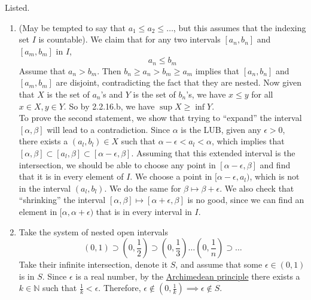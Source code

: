   \begin{solution}
    Listed. 
    \begin{enumerate}
      \item (May be tempted to say that $a_1 \leq a_2 \leq \ldots$, but this assumes that the indexing set $I$ is countable). We claim that for any two intervals $[a_n, b_n]$ and $[a_m, b_m]$ in $I$, 
      \begin{equation}
        a_n \leq b_m
      \end{equation}
      Assume that $a_n > b_m$. Then $b_n \geq a_n > b_m \geq a_m$ implies that $[a_n, b_n]$ and $[a_m, b_m]$ are disjoint, contradicting the fact that they are nested. Now given that $X$ is the set of $a_n$'s and $Y$ is the set of $b_n$'s, we have $x \leq y$ for all $x \in X, y \in Y$. So by 2.2.16.b, we have $\sup{X} \geq \inf{Y}$. 
      \\
      To prove the second statement, we show that trying to ``expand'' the interval $[\alpha, \beta]$ will lead to a contradiction. Since $\alpha$ is the LUB, given any $\epsilon > 0$, there exists a $(a_l, b_l) \in X$ such that $\alpha - \epsilon < a_l < \alpha$, which implies that $ [\alpha, \beta] \subset [a_l, \beta] \subset [\alpha - \epsilon, \beta]$. Assuming that this extended interval is the intersection, we should be able to choose any point in $[\alpha - \epsilon, \beta]$ and find that it is in every element of $I$. We choose a point in $[\alpha - \epsilon, a_l)$, which is not in the interval $(a_l, b_l)$. We do the same for $\beta \mapsto \beta + \epsilon$. We also check that ``shrinking'' the interval $[\alpha, \beta] \mapsto [\alpha + \epsilon, \beta]$ is no good, since we can find an element in $[\alpha, \alpha + \epsilon)$ that is in every interval in $I$. 
      
      \item Take the system of nested open intervals 
      \begin{equation}
        (0, 1) \supset (0, \frac{1}{2}) \supset (0, \frac{1}{3}) \ldots (0, \frac{1}{n}) \supset \ldots
      \end{equation}
      Take their infinite intersection, denote it $S$, and assume that some $\epsilon \in (0, 1)$ is in $S$. Since $\epsilon$ is a real number, by the \hyperref[def:archimedean-principle]{Archimedean principle} there exists a $k \in \mathbb{N}$ such that $\frac{1}{k} < \epsilon$. Therefore, $\epsilon \not\in (0, \frac{1}{k}) \implies \epsilon \not\in S$. 
    \end{enumerate}
  \end{solution}

